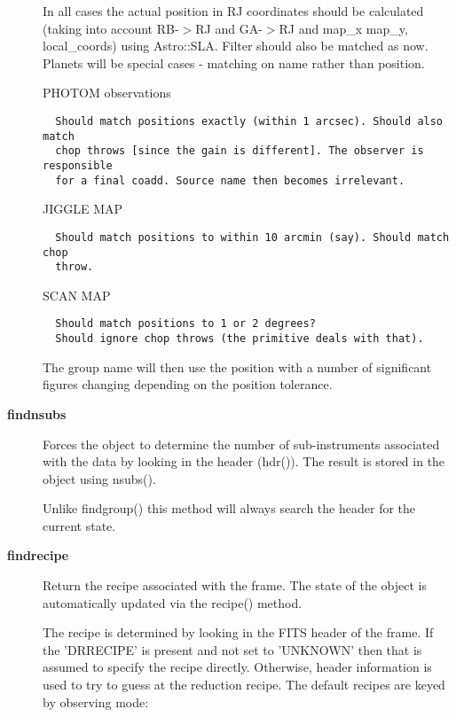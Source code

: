 \begin{description}
In all cases the actual position in RJ coordinates should be calculated
(taking into account RB-$>$RJ and GA-$>$RJ and map\_x map\_y, local\_coords) 
using Astro::SLA. Filter should also be matched as now.
Planets will be special cases - matching on name rather than position.



PHOTOM observations

\begin{verbatim}
  Should match positions exactly (within 1 arcsec). Should also match
  chop throws [since the gain is different]. The observer is responsible
  for a final coadd. Source name then becomes irrelevant.
\end{verbatim}


JIGGLE MAP

\begin{verbatim}
  Should match positions to within 10 arcmin (say). Should match chop
  throw.
\end{verbatim}


SCAN MAP

\begin{verbatim}
  Should match positions to 1 or 2 degrees?
  Should ignore chop throws (the primitive deals with that).
\end{verbatim}


The group name will then use the position with a number of significant
figures changing depending on the position tolerance.

\item[\textbf{findnsubs}] \mbox{}

Forces the object to determine the number of sub-instruments
associated with the data by looking in the header (hdr()). 
The result is stored in the object using nsubs().



Unlike findgroup() this method will always search the header for
the current state.

\item[\textbf{findrecipe}] \mbox{}

Return the recipe associated with the frame.
The state of the object is automatically updated via the
recipe() method.



The recipe is determined by looking in the FITS header
of the frame. If the 'DRRECIPE' is present and not
set to 'UNKNOWN' then that is assumed to specify the recipe
directly. Otherwise, header information is used to try
to guess at the reduction recipe. The default recipes
are keyed by observing mode:


\end{description}
